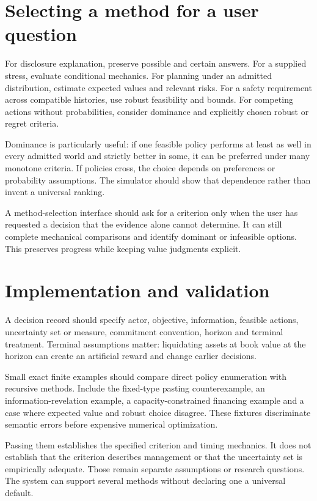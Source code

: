 \section{Selecting a method for a user question}
For disclosure explanation, preserve possible and certain answers. For a supplied stress, evaluate conditional mechanics. For planning under an admitted distribution, estimate expected values and relevant risks. For a safety requirement across compatible histories, use robust feasibility and bounds. For competing actions without probabilities, consider dominance and explicitly chosen robust or regret criteria.

Dominance is particularly useful: if one feasible policy performs at least as well in every admitted world and strictly better in some, it can be preferred under many monotone criteria. If policies cross, the choice depends on preferences or probability assumptions. The simulator should show that dependence rather than invent a universal ranking.

A method-selection interface should ask for a criterion only when the user has requested a decision that the evidence alone cannot determine. It can still complete mechanical comparisons and identify dominant or infeasible options. This preserves progress while keeping value judgments explicit.

\section{Implementation and validation}
A decision record should specify actor, objective, information, feasible actions, uncertainty set or measure, commitment convention, horizon and terminal treatment. Terminal assumptions matter: liquidating assets at book value at the horizon can create an artificial reward and change earlier decisions.

Small exact finite examples should compare direct policy enumeration with recursive methods. Include the fixed-type pasting counterexample, an information-revelation example, a capacity-constrained financing example and a case where expected value and robust choice disagree. These fixtures discriminate semantic errors before expensive numerical optimization.

Passing them establishes the specified criterion and timing mechanics. It does not establish that the criterion describes management or that the uncertainty set is empirically adequate. Those remain separate assumptions or research questions. The system can support several methods without declaring one a universal default.
